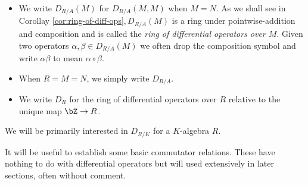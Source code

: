 \begin{notate}$ $
	\begin{itemize}
		\item We write $D_{R/A}(M)$ for $D_{R/A}(M,M)$ when $M = N$. As we shall see in Corollay \ref{cor:ring-of-diff-ops}$, D_{R/A}(M)$ is a ring under pointwise-addition and composition and is called the \emph{ring of differential operators over $M$}. Given two operators $\alpha,\beta \in D_{R/A}(M)$ we often drop the composition symbol and write $\alpha\beta$ to mean $\alpha\circ \beta$.
		\item When $R = M = N$, we simply write $D_{R/A}$.
		\item We write $D_R$ for the ring of differential operators over $R$ relative to the unique map $\bZ\to R$.
	\end{itemize}
\end{notate}
\noindent We will be primarily interested in $D_{R/K}$ for a $K$-algebra $R$.

It will be useful to establish some basic commutator relations. These have nothing to do with differential operators but will used extensively in later sections, often without comment.

